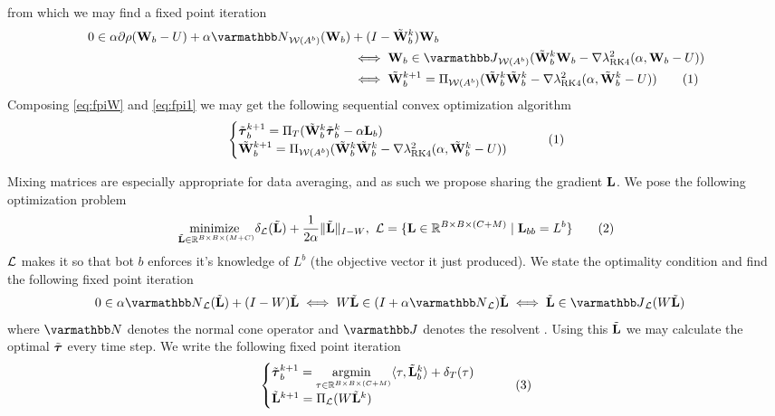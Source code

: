 \documentclass{article}
\newcommand\numberthis{\addtocounter{equation}{1}\tag{\theequation}}
\begin{document}
from which we may find a fixed point iteration
\begin{align*}
    0 \in \alpha \partial \rho(\vW_b - U) + 
    \alpha \opN_{\cW(A^b)}(\vW_b) &+ (I - \tilde{\vW}^k_b)\vW_b
    \\
    &\iff
    \vW_b \in \opJ_{\cW(A^b)}(\tilde{\vW}^k_b \vW_b - \nabla \lambda^2_\text{RK4}(\alpha, \vW_b - U)) \\
    &\iff
    \tilde{\vW}^{k+1}_b = \Pi_{\cW(A^b)}(\tilde{\vW}^k_b \tilde{\vW}^k_b - \nabla \lambda^2_\text{RK4}(\alpha, \tilde{\vW}^k_b - U))
    \numberthis \label{eq:fpiW}
\end{align*}
Composing \ref{eq:fpiW} and \ref{eq:fpi1} we may get the following sequential convex optimization algorithm
\begin{align*}
    \begin{cases}
        \tilde{\vtau}_b^{k+1} = \Pi_T(\tilde{\vW}_b^k\tilde{\vtau}_b^{k} - \alpha \vL_b)\\
        \tilde{\vW}_b^{k+1} = \Pi_{\cW(A^b)}(\tilde{\vW}_b^k \tilde{\vW}_b^k - \nabla \lambda^2_\text{RK4}(\alpha, \tilde{\vW}^k_b - U))
    \end{cases}
    \numberthis \label{eq:pgd_no_share}
\end{align*}


 Mixing matrices are especially appropriate for data averaging, and as such we propose sharing the gradient ${\mathbf{L}}$. We pose the following optimization problem
\begin{align*}
    \underset{\tilde{\vL} \in \RR^{B \times B \times (M+C)}}{\text{minimize }} \delta_{\cL}(\tilde{\vL}) + \frac{1}{2 \alpha}\|\tilde{\vL}\|_{I-W},\ 
    \cL = \{ \vL \in \RR^{B \times B \times (C+M)}\mid \vL_{bb} = L^{b} \}
    \numberthis \label{eq:objective_function_alt}
\end{align*}
${\mathcal{L}}$ makes it so that bot $b$ enforces it's knowledge of $L^b$ (the objective vector it just produced).
We state the optimality condition and find the following fixed point iteration
\begin{align*}
    0 \in \alpha \opN_{\cL}(\tilde{\vL}) + (I - W)\tilde{\vL}
    &\iff
    W\tilde{\vL} \in (I + \alpha \opN_{\cL})\tilde{\vL}
    \iff
    \tilde{\vL} \in \opJ_{\cL}(W\tilde{\vL}) 
\end{align*}
where $\opN$ denotes the normal cone operator and $\opJ$ denotes the resolvent \cite{ryu2022large}. Using this $\tilde{{\mathbf{L}}}$ we may calculate the optimal $\tilde{\boldsymbol{\tau}}$ every time step. We write the following fixed point iteration
\begin{align*}
    \begin{cases}
    \tilde{\vtau}_b^{k+1} = \underset{\tau \in \RR^{B\times B\times(C+M)} }{\text{argmin }} \langle \tau, \tilde{\vL}_b^k \rangle + \delta_T(\tau) \\
    \tilde{\vL}^{k+1} = \Pi_{\cL}(W\tilde{\vL}^{k})
    \end{cases}
    \numberthis \label{eq:fpi3}
\end{align*}
\end{document}
